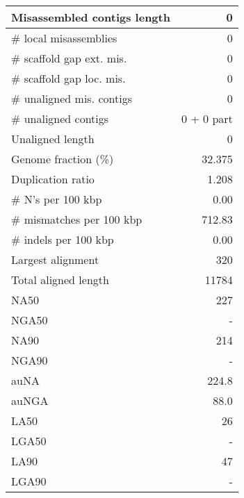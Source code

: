 \documentclass[12pt,a4paper]{article}
\begin{document}
\begin{table}[ht]
\begin{center}
\begin{tabular}{|l*{1}{|r}|}
Misassembled contigs length & 0 \\ \hline
\# local misassemblies & 0 \\ \hline
\# scaffold gap ext. mis. & 0 \\ \hline
\# scaffold gap loc. mis. & 0 \\ \hline
\# unaligned mis. contigs & 0 \\ \hline
\# unaligned contigs & 0 + 0 part \\ \hline
Unaligned length & 0 \\ \hline
Genome fraction (\%) & 32.375 \\ \hline
Duplication ratio & 1.208 \\ \hline
\# N's per 100 kbp & 0.00 \\ \hline
\# mismatches per 100 kbp & 712.83 \\ \hline
\# indels per 100 kbp & 0.00 \\ \hline
Largest alignment & 320 \\ \hline
Total aligned length & 11784 \\ \hline
NA50 & 227 \\ \hline
NGA50 & - \\ \hline
NA90 & 214 \\ \hline
NGA90 & - \\ \hline
auNA & 224.8 \\ \hline
auNGA & 88.0 \\ \hline
LA50 & 26 \\ \hline
LGA50 & - \\ \hline
LA90 & 47 \\ \hline
LGA90 & - \\ \hline
\end{tabular}
\end{center}
\end{table}
\end{document}
